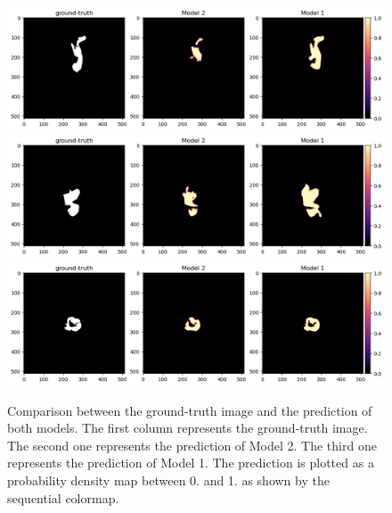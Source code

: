 \documentclass{standalone}
\begin{document}
\begin{figure}[htp]

    \centering
    \includegraphics[width=\textwidth]{../images/predcomparison3.png}
    \includegraphics[width=\textwidth]{../images/predcomparison4.png}
    \includegraphics[width=\textwidth]{../images/predcomparison5.png}
    

    \caption{Comparison between the ground-truth image and the prediction of both models. 
    The first column represents the ground-truth image. 
    The second one represents the prediction of Model 2. 
    The third one represents the prediction of Model 1.
    The prediction is plotted as a probability density map between 0. and 1. as shown by the sequential colormap.}\label{predcomparison2}

\end{figure}
\end{document}
